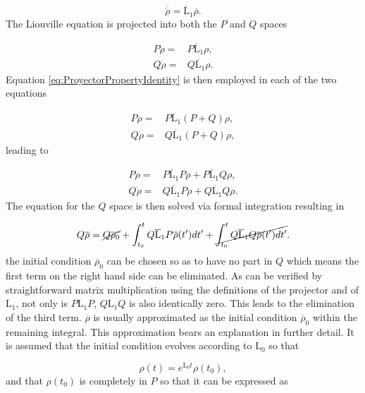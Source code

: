 \documentclass[12pt]{article}
\begin{document}
\begin{equation}
    \overline{\dot{\rho}} = \overline{\mathrm{L}}_1 \overline{\rho}. 
\end{equation} The Liouville equation is projected into both the $P$ and $Q$ spaces

\begin{align}
    P\dot{\rho} =& P\overline{\mathrm{L}}_1\rho,\\
    Q\dot{\rho} =& Q\overline{\mathrm{L}}_1\rho.
\end{align} Equation \eqref{eq:ProyectorPropertyIdentity} is then employed in each of the two equations

\begin{align}
    P\dot{\rho} =& P\overline{\mathrm{L}}_1(P+Q)\rho,\\
    Q\dot{\rho} =& Q\overline{\mathrm{L}}_1(P+Q)\rho,  
\end{align} leading to

\begin{align}
    P\dot{\rho} =& P\overline{\mathrm{L}}_1P\rho+P\overline{\mathrm{L}}_1Q\rho,\\
    Q\dot{\rho} =& Q\overline{\mathrm{L}}_1P\rho+Q\overline{\mathrm{L}}_1Q\rho.
\end{align} The equation for the $Q$ space is then solved via formal integration resulting in

\begin{equation}
    Q\overline{\rho} = \cancel{Q\overline{\rho_0}} + \int_{t_0}^t Q\overline{\mathrm{L}}_1P\overline{\rho}(t') dt'+\cancel{\int_{t_0}^t Q\overline{\mathrm{L}}_1Q\overline{\rho}(t') dt'}.
\end{equation} the initial condition $\overline{\rho}_0$ can be chosen so as to have no part in $Q$ which means the first term on the right hand side can be eliminated. As can be verified by straightforward matrix multiplication using the definitions of the projector and of $\mathrm{L}_1$, not only is $P\mathrm{L}_1 P$, $Q\mathrm{L}_1Q$ is also identically zero. This leads to the elimination of the third term. $\overline{\rho}$ is usually approximated as the initial condition $\overline{\rho}_0$ within the remaining integral. This approximation bears an explanation in further detail. It is assumed that the initial condition evolves according to $\mathrm{L}_0$ so that

\begin{equation}\label{eq:InitialConditionDef}
\rho(t) = e^{\mathrm{L}_0 t}\rho(t_0),
\end{equation} and that $\rho(t_0)$ is completely in $P$ so that it can be expressed as
\end{document}

